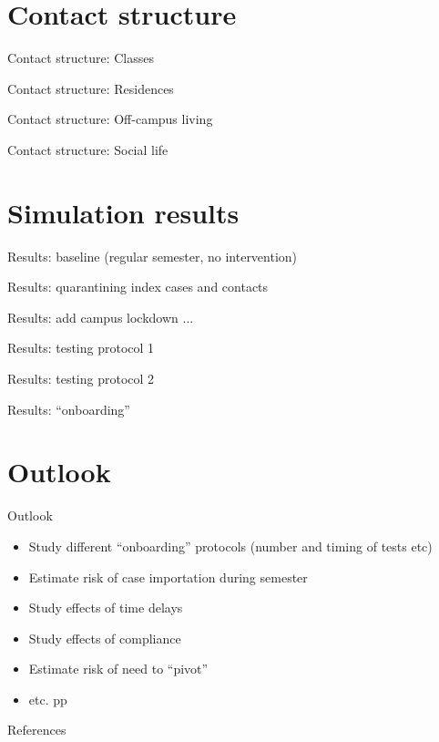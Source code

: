 \documentclass{beamer}
\begin{document}
  \section*{Contact structure}
   \begin{frame}{Contact structure: Classes}
  \end{frame}
   \begin{frame}{Contact structure: Residences}
  \end{frame}
   \begin{frame}{Contact structure: Off-campus living}
  \end{frame}
   \begin{frame}{Contact structure: Social life}
  \end{frame}
  \section*{Simulation results}
   \begin{frame}{Results: baseline (regular semester, no intervention)}
  \end{frame}
   \begin{frame}{Results: quarantining index cases and contacts}
  \end{frame}
  \begin{frame}{Results: add campus lockdown ...}
  \end{frame}
  \begin{frame}{Results: testing protocol 1}
  \end{frame} 
   \begin{frame}{Results: testing protocol 2}
  \end{frame} 
   \begin{frame}{Results: ``onboarding''}
  \end{frame} 
  \section*{Outlook}
  \begin{frame}{Outlook}
  \begin{itemize}
  \item Study different ``onboarding'' protocols (number and timing of tests etc)   \pause 
  \item Estimate risk of case importation during semester \pause 
  \item Study effects of time delays \pause 
  \item Study effects of compliance \pause
  \item Estimate risk of need to ``pivot'' \pause
  \item etc. pp    
  \end{itemize} 
  \end{frame} 
   \begin{frame}[allowframebreaks]{References}
   
 
  \end{frame} 
\end{document}
